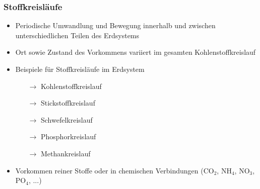 \begin{frame}
	\frametitle{Stoffkreisläufe}

	\begin{itemize}
		\item Periodische Umwandlung und Bewegung innerhalb und zwischen unterschiedlichen Teilen des Erdsystems
		\item Ort sowie Zustand des Vorkommens variiert im gesamten Kohlenstoffkreislauf
		\item Beispiele für Stoffkreisläufe im Erdsystem
		\begin{itemize}
			\item [$\rightarrow$] Kohlenstoffkreislauf
			\item [$\rightarrow$] Stickstoffkreislauf
			\item [$\rightarrow$] Schwefelkreislauf
			\item [$\rightarrow$] Phosphorkreislauf
			\item [$\rightarrow$] Methankreislauf
		\end{itemize}
		\item Vorkommen reiner Stoffe oder in chemischen Verbindungen (CO$_2$, NH$_4$, NO$_3$, PO$_4$, ...)
	\end{itemize}

\end{frame}
